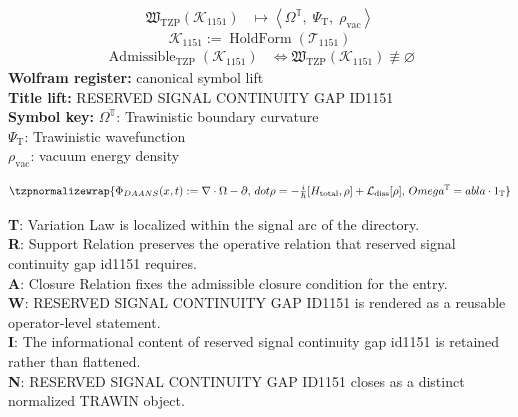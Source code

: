 \noindent
\begin{minipage}[t]{0.48\linewidth}
\begingroup
\small
\[
\begin{aligned}
\mathfrak{W}_{\mathrm{TZP}}\!\left(\mathcal{K}_{1151}\right)
&\longmapsto
\left\langle \Omega^{\mathbb{T}},\; \Psi_{\mathrm{T}},\; \rho_{\mathrm{vac}} \right\rangle
\end{aligned}
\]
\[
\mathcal{K}_{1151}
:=
\operatorname{HoldForm}\!\left(\mathcal{T}_{1151}\right)
\]
\[
\begin{aligned}
\operatorname{Admissible}_{\mathrm{TZP}}\!\left(\mathcal{K}_{1151}\right)
&\Longleftrightarrow
\mathfrak{W}_{\mathrm{TZP}}\!\left(\mathcal{K}_{1151}\right)\not\equiv\varnothing
\end{aligned}
\]
\textbf{Wolfram register:} canonical symbol lift\\
\textbf{Title lift:} RESERVED SIGNAL CONTINUITY GAP ID1151\\
\textbf{Symbol key:} \(\Omega^{\mathbb{T}}\): Trawinistic boundary curvature\\ \(\Psi_{\mathrm{T}}\): Trawinistic wavefunction\\ \(\rho_{\mathrm{vac}}\): vacuum energy density
\par
\endgroup
\end{minipage}\hfill
\begin{minipage}[t]{0.48\linewidth}
\[
\tzpnormalizewrap{\Phi_{DAANS}(x,t):=\nabla\cdot\Omega-\partial,\,dot\rho = -\tfrac{i}{\hbar}[H_{\rm total},\rho]+\mathcal L_{\rm diss}[\rho],\,Omega^{\mathbb{T}}= abla\cdot1_{\mathbb{T}}}
\]

\small
\textbf{T}: Variation Law is localized within the signal arc of the directory.\\
\textbf{R}: Support Relation preserves the operative relation that reserved signal continuity gap id1151 requires.\\
\textbf{A}: Closure Relation fixes the admissible closure condition for the entry.\\
\textbf{W}: RESERVED SIGNAL CONTINUITY GAP ID1151 is rendered as a reusable operator-level statement.\\
\textbf{I}: The informational content of reserved signal continuity gap id1151 is retained rather than flattened.\\
\textbf{N}: RESERVED SIGNAL CONTINUITY GAP ID1151 closes as a distinct normalized TRAWIN object.
\normalsize
\end{minipage}

